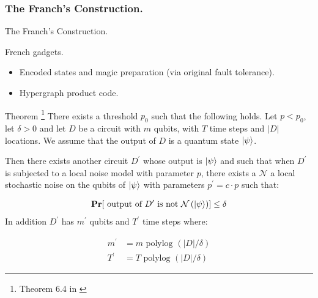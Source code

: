 \documentclass{beamer}
\begin{document}
\begin{frame}
  \frametitle{The Franch's Construction.
}

  \begin{refsection}
\cite{Tillich_2014} \cite{Leverrier_2015} \cite{grospellier:tel-03364419}
  \printbibliography
\end{refsection}

\end{frame}


\begin{frame}{The Franch's Construction.}
 \begin{block}{French gadgets.}
   \begin{itemize}
     \item Encoded states and magic preparation (via original fault tolerance).
     \item Hypergraph product code. 
   \end{itemize}
 \end{block}
\end{frame}

\begin{frame}
  \begin{block}{Theorem \footnote{Theorem 6.4 in \cite{grospellier:tel-03364419}}} There exists a threshold $p_{0}$ such that the following holds. Let $p < p_{0}$, let $\delta > 0$ and let $D$ be a circuit with $m$ qubits, with $T$ time steps and $|D|$ locations. We assume that the output of $D$ is a quantum state $\ket{\psi}$. 

    Then there exists another circuit $D^{\prime}$ whose output is $\ket{\psi}$ and such that when $D^{\prime}$ is subjected to a local noise model with parameter $p$, there exists a $\mathcal{N}$ a local stochastic noise on the qubits of $\ket{\psi}$ with parameters $p^{\prime} = c \cdot p$ such that: 

    \begin{equation*}
      \begin{split}
        \mathbf{Pr}[  \text{ output of } D^{\prime} \text { is not } \mathcal{N}\left( \ket{\psi} \right)   ]\le \delta
      \end{split}
    \end{equation*}
    In addition $D^{\prime}$ has $m^{\prime}$ qubits and $T^{\prime}$ time steps where: 

    \begin{equation*}
      \begin{split}
        m^{\prime} &= m \text{ polylog } \left( |D|/\delta \right) \\ 
        T^{\prime} &= T \text{ polylog } \left( |D|/\delta \right) 
      \end{split}
    \end{equation*}
  \end{block}
\end{frame}
\end{document}
